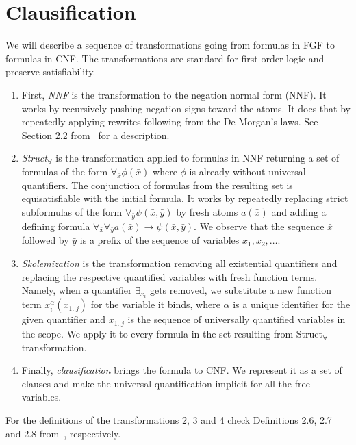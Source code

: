 \documentclass[english, shortabstract]{iithesis}
\theoremstyle{definition} \newtheorem{definition}{Definition}[chapter]
\theoremstyle{remark} \newtheorem{remark}[definition]{Observation}
\theoremstyle{plain} \newtheorem{theorem}[definition]{Theorem}
\theoremstyle{plain} \newtheorem{lemma}[definition]{Lemma}
\begin{document}
\section{Clausification}

We will describe a sequence of transformations going from formulas in FGF to formulas in CNF.
The transformations are standard for first-order logic and preserve satisfiability.
\begin{enumerate}
    \item First, \emph{NNF} is the transformation to the negation normal form (NNF). 
    It works by recursively pushing negation signs toward the atoms.
    It does that by repeatedly applying rewrites following from the De Morgan's laws. 
    See Section 2.2 from~\cite{leitsch} for a description.
    \item \emph{Struct\textsubscript{{$\forall$}}} is the transformation applied to formulas in NNF returning a set of formulas of the form $\forall_{\bar{x}}\phi(\bar{x})$ where $\phi$ is already without universal quantifiers.
    The conjunction of formulas from the resulting set is equisatisfiable with the initial formula.
    It works by repeatedly replacing strict subformulas of the form $\forall_{\bar{y}} \psi(\bar{x},\bar{y})$ 
    by fresh atoms $a(\bar{x})$ and adding a defining formula $\forall_{\bar{x}} \forall_{\bar{y}} a(\bar{x}) \rightarrow \psi(\bar{x},\bar{y})$.
    We observe that the sequence $\bar{x}$ followed by $\bar{y}$ is a prefix of the sequence of variables $x_1,x_2,\dots$.
    \item \emph{Skolemization} is the transformation removing all existential quantifiers and replacing the respective quantified variables with fresh function terms.
    Namely, when a quantifier $\exists_{x_i}$ gets removed, we substitute a new function term $x_i^{\alpha}(\bar{x}_{1..j})$ for the variable it binds, 
    where $\alpha$ is a unique identifier for the given quantifier and $\bar{x}_{1..j}$ is the sequence of universally quantified variables in the scope.
    We apply it to every formula in the set resulting from Struct\textsubscript{{$\forall$}} transformation.
    \item Finally, \emph{clausification} brings the formula to CNF.
    We represent it as a set of clauses and make the universal quantification implicit for all the free variables. 
\end{enumerate}

For the definitions of the transformations 2, 3 and 4 check Definitions 2.6, 2.7 and 2.8 from~\cite{nivelle}, respectively.
\end{document}
